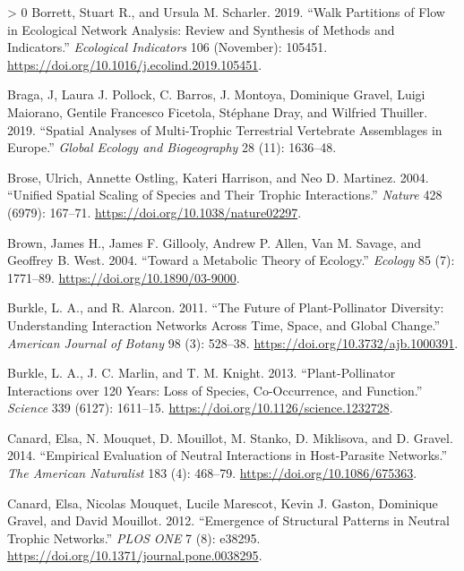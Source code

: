 \documentclass[11pt]{article}
\newlength{\cslhangindent}
\newenvironment{CSLReferences}[3] %
 {%
  \setlength{\parindent}{0pt}
  \ifodd #1 \everypar{\setlength{\hangindent}{\cslhangindent}}\ignorespaces\fi
  \ifnum #2 > 0
  \setlength{\parskip}{#2\baselineskip}
  \fi
 }%
 {}
\begin{document}
\begin{CSLReferences}{1}{0}
\leavevmode\hypertarget{ref-Borrett2019WalPar}{}%
Borrett, Stuart R., and Ursula M. Scharler. 2019. {``Walk Partitions of
Flow in Ecological Network Analysis: Review and Synthesis of Methods and
Indicators.''} \emph{Ecological Indicators} 106 (November): 105451.
\url{https://doi.org/10.1016/j.ecolind.2019.105451}.

\leavevmode\hypertarget{ref-Braga2019SpaAna}{}%
Braga, J, Laura J. Pollock, C. Barros, J. Montoya, Dominique Gravel,
Luigi Maiorano, Gentile Francesco Ficetola, Stéphane Dray, and Wilfried
Thuiller. 2019. {``Spatial Analyses of Multi-Trophic Terrestrial
Vertebrate Assemblages in Europe.''} \emph{Global Ecology and
Biogeography} 28 (11): 1636--48.

\leavevmode\hypertarget{ref-Brose2004UniSpa}{}%
Brose, Ulrich, Annette Ostling, Kateri Harrison, and Neo D. Martinez.
2004. {``Unified Spatial Scaling of Species and Their Trophic
Interactions.''} \emph{Nature} 428 (6979): 167--71.
\url{https://doi.org/10.1038/nature02297}.

\leavevmode\hypertarget{ref-Brown2004MetThe}{}%
Brown, James H., James F. Gillooly, Andrew P. Allen, Van M. Savage, and
Geoffrey B. West. 2004. {``Toward a Metabolic Theory of Ecology.''}
\emph{Ecology} 85 (7): 1771--89. \url{https://doi.org/10.1890/03-9000}.

\leavevmode\hypertarget{ref-Burkle2011FutPla}{}%
Burkle, L. A., and R. Alarcon. 2011. {``The Future of Plant-Pollinator
Diversity: Understanding Interaction Networks Across Time, Space, and
Global Change.''} \emph{American Journal of Botany} 98 (3): 528--38.
\url{https://doi.org/10.3732/ajb.1000391}.

\leavevmode\hypertarget{ref-Burkle2013PlaInt}{}%
Burkle, L. A., J. C. Marlin, and T. M. Knight. 2013. {``Plant-Pollinator
Interactions over 120 Years: Loss of Species, Co-Occurrence, and
Function.''} \emph{Science} 339 (6127): 1611--15.
\url{https://doi.org/10.1126/science.1232728}.

\leavevmode\hypertarget{ref-Canard2014EmpEva}{}%
Canard, Elsa, N. Mouquet, D. Mouillot, M. Stanko, D. Miklisova, and D.
Gravel. 2014. {``Empirical Evaluation of Neutral Interactions in
Host-Parasite Networks.''} \emph{The American Naturalist} 183 (4):
468--79. \url{https://doi.org/10.1086/675363}.

\leavevmode\hypertarget{ref-Canard2012EmeStr}{}%
Canard, Elsa, Nicolas Mouquet, Lucile Marescot, Kevin J. Gaston,
Dominique Gravel, and David Mouillot. 2012. {``Emergence of Structural
Patterns in Neutral Trophic Networks.''} \emph{PLOS ONE} 7 (8): e38295.
\url{https://doi.org/10.1371/journal.pone.0038295}.


\end{CSLReferences}
\end{document}

